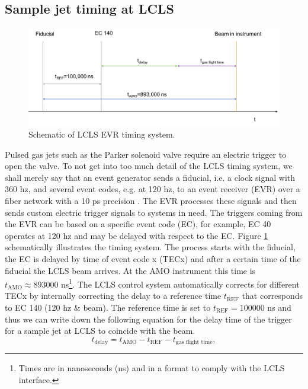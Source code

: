 \subsection{Sample jet timing at LCLS}\label{sec:jet-timing}
\begin{figure}
	\centering
		\includegraphics[width=1.00\textwidth]{images/LCLS-timing-schematic.png}
	\caption{Schematic of LCLS EVR timing system.}
	\label{fig:LCLS-EVR-timing}
\end{figure}
Pulsed gas jets such as the Parker solenoid valve require an electric trigger to open the valve. To not get into too much detail of the LCLS timing system, we shall merely say that an event generator sends a fiducial, i.e. a clock signal with 360 hz, and several event codes, e.g. at 120 hz, to an event receiver (EVR) over a fiber network with a 10 ps precision \citep{Krejcik-2007-DIPAC}. The EVR processes these signals and then sends custom electric trigger signals to systems in need. The triggers coming from the EVR can be based on a specific event code (EC), for example, EC 40 operates at 120 hz and may be delayed with respect to the EC. Figure \ref{fig:LCLS-EVR-timing} schematically illustrates the timing system. The process starts with the fiducial, the EC is delayed by time of event code x (TECx) and after a certain time of the fiducial the LCLS beam arrives. At the AMO instrument this time is $t_{\text{AMO}}\approx 893000$ ns\footnote{Times are in nanoseconds (ns) and in a format to comply with the LCLS interface.}. The LCLS control system automatically corrects for different TECx by internally correcting the delay to a reference time $t_{\text{REF}}$ that corresponds to EC 140 (120 hz \& beam). The reference time is set to $t_{\text{REF}}=100000$ ns and thus we can write down the following equation for the delay time of the trigger for a sample jet at LCLS to coincide with the beam.
\begin{equation}
t_{\text{delay}} = t_{\text{AMO}} - t_{\text{REF}} - t_{\text{gas flight time}},
\label{eqn:sample-jet-delay-time}
\end{equation}
